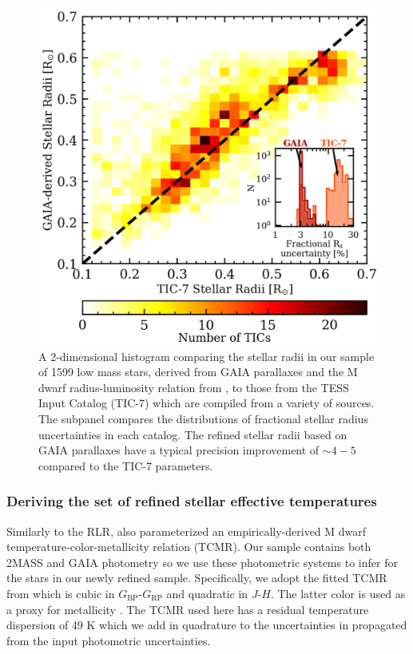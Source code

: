 \begin{figure}
  \centering
  \includegraphics[width=0.6\hsize]{figures/stellarradii.png}
  \caption[Comparison of stellar radii derived from GAIA parallaxes to values in the TIC-7.]
      {A 2-dimensional histogram comparing the stellar radii in our sample of 1599 low mass stars,
    derived from GAIA parallaxes and the M dwarf radius-luminosity relation from \cite{mann15}, to those
    from the TESS Input Catalog (TIC-7) which are compiled from a variety of sources. The subpanel compares the
    distributions of fractional stellar radius uncertainties in each catalog. The refined stellar radii 
    based on GAIA parallaxes have a typical precision improvement of $\sim 4-5$ compared to the TIC-7
    parameters.}
  \label{fig:Rs}
\end{figure}

\subsubsection{Deriving the set of refined stellar effective temperatures}
Similarly to the RLR, \citep{mann15} also parameterized an empirically-derived M dwarf temperature-color-metallicity
relation (TCMR). Our sample contains both 2MASS and GAIA photometry so we use these photometric systems to infer
\teff{} for the stars in our newly refined sample. Specifically, we adopt the fitted TCMR from \cite{mann15} which is
cubic in $G_{\text{BP}}$-$G_{\text{RP}}$ and quadratic in $J$-$H$. The latter color is used as a proxy for metallicity
\citep{leggett92,johnson12,mann13,newton14}. The TCMR used here has a residual temperature dispersion of 49 K which we
add in quadrature to the uncertainties in \teff{} propagated from the input photometric uncertainties.

